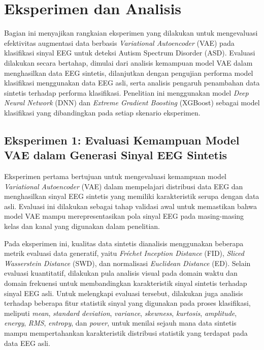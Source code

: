 \section{Eksperimen dan Analisis}
Bagian ini menyajikan rangkaian eksperimen yang dilakukan untuk mengevaluasi efektivitas augmentasi data berbasis \textit{Variational Autoencoder} (VAE) pada klasifikasi sinyal EEG untuk deteksi Autism Spectrum Disorder (ASD). Evaluasi dilakukan secara bertahap, dimulai dari analisis kemampuan model VAE dalam menghasilkan data EEG sintetis, dilanjutkan dengan pengujian performa model klasifikasi menggunakan data EEG asli, serta analisis pengaruh penambahan data sintetis terhadap performa klasifikasi. Penelitian ini menggunakan model \textit{Deep Neural Network} (DNN) dan \textit{Extreme Gradient Boosting} (XGBoost) sebagai model klasifikasi yang dibandingkan pada setiap skenario eksperimen.

\subsection{Eksperimen 1: Evaluasi Kemampuan Model VAE dalam Generasi Sinyal EEG Sintetis}

Eksperimen pertama bertujuan untuk mengevaluasi kemampuan model \textit{Variational Autoencoder} (VAE) dalam mempelajari distribusi data EEG dan menghasilkan sinyal EEG sintetis yang memiliki karakteristik serupa dengan data asli. Evaluasi ini dilakukan sebagai tahap validasi awal untuk memastikan bahwa model VAE mampu merepresentasikan pola sinyal EEG pada masing-masing kelas dan kanal yang digunakan dalam penelitian.

Pada eksperimen ini, kualitas data sintetis dianalisis menggunakan beberapa metrik evaluasi data generatif, yaitu \textit{Fréchet Inception Distance} (FID), \textit{Sliced Wasserstein Distance} (SWD), dan normalisasi \textit{Euclidean Distance} (ED). Selain evaluasi kuantitatif, dilakukan pula analisis visual pada domain waktu dan domain frekuensi untuk membandingkan karakteristik sinyal sintetis terhadap sinyal EEG asli. Untuk melengkapi evaluasi tersebut, dilakukan juga analisis terhadap beberapa fitur statistik sinyal yang digunakan pada proses klasifikasi, meliputi \textit{mean}, \textit{standard deviation}, \textit{variance}, \textit{skewness}, \textit{kurtosis}, \textit{amplitude}, \textit{energy}, \textit{RMS}, \textit{entropy}, dan \textit{power}, untuk menilai sejauh mana data sintetis mampu mempertahankan karakteristik distribusi statistik yang terdapat pada data EEG asli.

